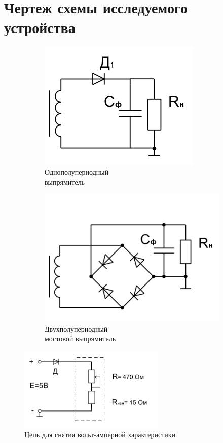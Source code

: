 \documentclass[a4paper,14pt]{extarticle}
\begin{document}
\section{Чертеж схемы исследуемого устройства}

\begin{figure}[h]
\begin{center}
	\begin{subfigure}[b]{0.35\textwidth}
		\includegraphics[scale=0.75]{diod}
		\caption{Однополупериодный \\выпрямитель}
	\end{subfigure}
	\begin{subfigure}[b]{0.35\textwidth}
		\includegraphics[scale=0.40]{four-diods}
		\caption{Двухполупериодный \\мостовой выпрямитель}
	\end{subfigure}
	\caption{}
\end{center}
\end{figure}

\vspace{-1cm}

\begin{figure}[H]
\begin{center}
	\includegraphics[width=7cm]{vac}
	\caption{Цепь для снятия вольт-амперной характеристики}
\end{center}
\end{figure}
\end{document}
